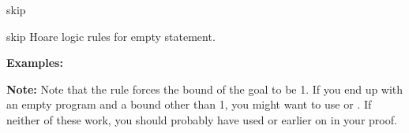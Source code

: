 \begin{tactic}{skip}
  \begin{tsyntax}{skip} Hoare logic rules for empty statement.

  \textbf{Examples:} 

  \textbf{Note:} Note that the \phl rule forces the bound of the goal
  to be 1. If you end up with an empty program and a bound other than
  1, you might want to use  or . If
  neither of these work, you should probably have used 
  or  earlier on in your proof.
  \end{tsyntax}
\end{tactic}
